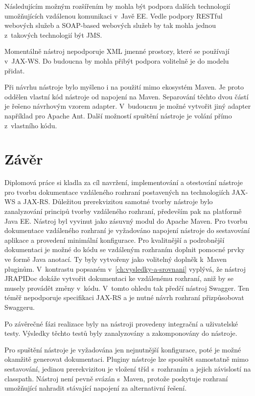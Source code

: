 \documentclass[11pt,twoside,a4paper]{book}
\begin{document}
Následujícím možným rozšířením by mohla být podpora dalších technologií
umožňujících vzdálenou komunikaci v~Javě EE. Vedle podpory RESTful webových
služeb a SOAP-based webových služeb by tak mohla jednou z~takových technologií
být JMS.

Momentálně nástroj nepodporuje XML jmenné prostory, které se používají v~JAX-WS.
Do budoucna by mohla přibýt podpora volitelně je do modelu přidat.

Při návrhu nástroje bylo myšleno i na použití mimo ekosystém Maven. Je proto
oddělen vlastní kód nástroje od napojení na Maven. Separování těchto dvou částí
je řešeno návrhovým vzorem adapter. V~budoucnu je možné vytvořit jiný adapter
například pro Apache Ant. Další možností spuštění nástroje je volání přímo
z~vlastního kódu.

\chapter{Závěr}

Diplomová práce si kladla za cíl navržení, implementování a otestování nástroje
pro tvorbu dokumentace vzdáleného rozhraní postavených na technologiích JAX-WS a
JAX-RS. Důležitou prerekvizitou samotné tvorby nástroje bylo zanalyzování
principů tvorby vzdáleného rozhraní, především pak na platformě Java EE. Nástroj
byl vyvinut jako zásuvný modul do Apache Maven. Pro tvorbu dokumentace
vzdáleného rozhraní je vyžadováno napojení nástroje do sestavování aplikace a
provedení minimální konfigurace. Pro kvalitnější a podrobnější dokumentaci je
možné do kódu se vzdáleným rozhraním doplnit pomocné
 prvky ve formě Java anotací. Ty byly vytvořeny jako volitelný doplněk k~Maven
 pluginům. V~kontrastu popsaném v~\ref{ch:vysledky-a-srovnani} vyplývá, že
 nástroj JRAPIDoc dokáže vytvořit dokumentaci ke vzdálenému rozhraní, aniž by se
 musely provádět změny v~kódu. V~tomto ohledu tak předčí nástroj Swagger. Ten
 téměř nepodporuje specifikaci JAX-RS a je nutné návrh rozhraní přizpůsobovat
 Swaggeru.
 
Po závěrečné fázi realizace byly na nástroji provedeny integrační a uživatelské
testy.
Výsledky těchto testů byly zanalyzovány a zakomponovány do nástroje.

Pro spuštění nástroje je vyžadována jen nejnutnější konfigurace, poté je možné
okamžitě generovat dokumentaci. Pluginy nástroje lze spouštět samostatně mimo
sestavování, jedinou prerekvizitou je vložení tříd s~rozhraním a jejich
závislostí na classpath. Nástroj není pevně svázán s~Maven, protože poskytuje
rozhraní umožňující nahradit stávající napojení za alternativní řešení.
\end{document}
